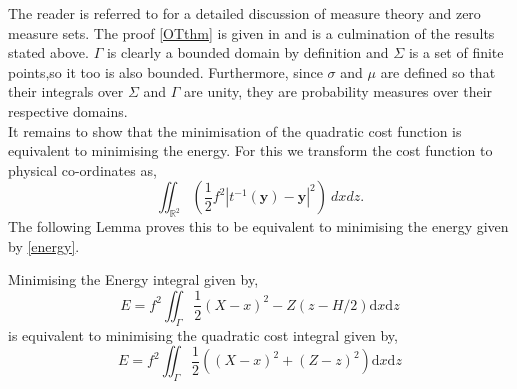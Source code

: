 The reader is referred to \cite{Rudin1987} for a detailed discussion of measure theory and zero measure sets. The proof \ref{OTthm} is given in \cite{Cullen2006a} and is a culmination of the results stated above. $\Gamma$ is clearly a bounded domain by definition and $\Sigma$ is a set of finite points,so it too is also bounded. Furthermore, since $\sigma$ and $\mu$ are defined so that their integrals over $\Sigma$ and $\Gamma$ are unity, they are probability measures over their respective domains.
\\
\linebreak
It remains to show that the minimisation of the quadratic cost function is equivalent to minimising the energy. For this we transform the cost function to physical co-ordinates as,
\begin{equation*}
\iint_{\mathbb{R}^2} \left(\frac{1}{2}f^2|t^{-1}(\bm{y})-\bm{y}|^2\right) \ dxdz.
\end{equation*}
The following Lemma proves this to be equivalent to minimising the energy given by \ref{energy}.
\begin{lemma}
	Minimising the Energy integral given by,
	\begin{equation*}
	E = f^2 \iint_{\Gamma} \frac{1}{2}\left(X-x\right)^2 - Z\left(z - H/2\right)\textrm{d}x\textrm{d}z
	\end{equation*} 
	is equivalent to minimising the quadratic cost integral given by,
	\begin{equation*}
	E = f^2 \iint_{\Gamma} \frac{1}{2}\left(\left(X-x\right)^2 + \left(Z - z\right)^2\right)\textrm{d}x\textrm{d}z
	\label{energy1}
	\end{equation*}
	\label{energy lemma}
\end{lemma}
